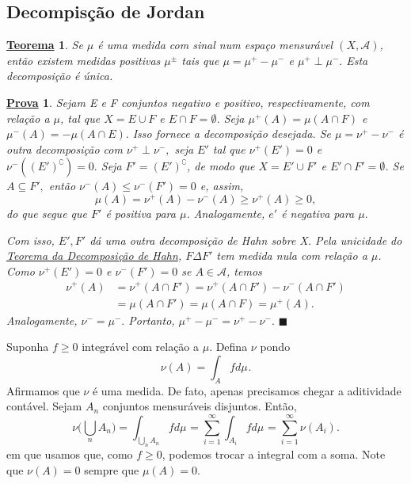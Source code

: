 \documentclass{article}
\newtheorem*{theorem*}{\underline{Teorema}}
\newtheorem*{proof*}{\underline{Prova}}
\renewcommand\qedsymbol{$\blacksquare$}
\begin{document}
\subsection{Decompisção de Jordan}
 \hypertarget{jordan_decomposition}{
\begin{theorem*}
  Se \(\mu \) é uma medida com sinal num espaço mensurável \((X, \mathcal{A})\), então existem medidas positivas \(\mu ^{\pm}\) tais que \(\mu = \mu ^{+} - \mu ^{-}\) e \(\mu ^{+}\perp \mu ^{-}.\) Esta decomposição é única.
\end{theorem*}}
\begin{proof*}
  Sejam E e F conjuntos negativo e positivo, respectivamente, com relação a \(\mu \), tal que \(X = E\cup F\) e \(E\cap F = \emptyset \). Seja \(\mu ^{+}(A) = \mu (A\cap F)\) e \(\mu ^{-}(A)=-\mu (A\cap E).\) Isso 
  fornece a decomposição desejada. Se \(\mu = \nu^{+}-\nu^{-}\) é outra decomposição com \(\nu^{+}\perp \nu^{-},\) seja \(E'\) tal que \(\nu^{+}(E') = 0\) e 
  \(\nu^{-}((E')^{\complement}) = 0.\) Seja \(F'=(E')^{\complement}\), de modo que \(X = E' \cup F'\) e \(E'\cap F' = \emptyset \). Se \(A\subseteq F',\) então \(\nu^{-}(A)\leq \nu^{-}(F') = 0\) e, assim,
    \[
      \mu (A) = \nu ^{+}(A) - \nu ^{-}(A) \geq \nu ^{+}(A) \geq 0,
    \]
  do que segue que \(F'\) é positiva para \(\mu \). Analogamente, \(e'\) é negativa para \(\mu .\) 

  Com isso, \(E', F'\) dá uma outra decomposição de Hahn sobre X. Pela unicidade do \hyperlink{hahn}{Teorema da Decomposição de Hahn}, \(F\Delta F'\) tem medida nula com relação a \(\mu \). Como \(\nu ^{+}(E') = 0\) e \(\nu^{-}(F') = 0\)
se \(A\in \mathcal{A}\), temos 
 \begin{align*}
   \nu ^{+}(A) &= \nu ^{+}(A\cap F') = \nu ^{+}(A\cap F') - \nu ^{-}(A\cap F')\\ 
               &= \mu (A\cap F') = \mu (A\cap F) = \mu ^{+}(A).
 \end{align*}
 Analogamente, \(\nu^{-}=\mu ^{-}.\) Portanto, \(\mu^{+}-\mu ^{-}= \nu^{+}-\nu ^{-}. \) \qedsymbol
\end{proof*}
   Suponha \(f\geq 0\) integrável com relação a \(\mu \). Defina \(\nu \) pondo 
     \[
       \nu (A) = \int_{A}f d\mu_{}.
     \]
    Afirmamos que \(\nu \) é uma medida. De fato, apenas precisamos chegar a aditividade contável. Sejam \(A_{n}\) conjuntos mensuráveis disjuntos. Então,
      \[
        \nu \biggl(\bigcup_{n}^{}A_{n}\biggr) = \int_{\bigcup_{n}^{}A_{n}}f d\mu_{} = \sum\limits_{i=1}^{\infty}\int_{A_{i}}f d\mu_{} = \sum\limits_{i=1}^{\infty}\nu (A_{i}).
      \]
    em que usamos que, como \(f\geq 0\), podemos trocar a integral com a soma. Note que \(\nu (A) = 0\) sempre que \(\mu (A) = 0\). 
\end{document}

